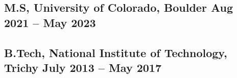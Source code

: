 
\subsection{M.S, University of Colorado, Boulder	\hfill {Aug 2021 -- May 2023}}

\vspace{1mm}

\subsection{B.Tech, National Institute of Technology, Trichy \hfill	{July 2013 -- May 2017}}

